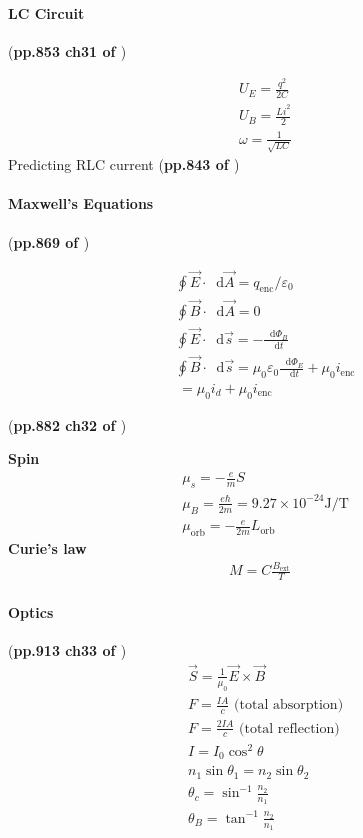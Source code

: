 \documentclass{article}
\newcommand*\diff{\mathop{}\!\mathrm{d}}
\numberwithin{equation}{subsection} %
\theoremstyle{definition}
\begin{document}
\paragraph{LC Circuit} (\textbf{pp.853 ch31 of \cite{book}})

\begin{align}
    & U_E = \frac{q^2}{2C} \\
    & U_B = \frac{L i^2}{2} \\
    & \omega = \frac{1}{\sqrt{LC}}
\end{align}
Predicting RLC current (\textbf{pp.843 of \cite{book}})

\paragraph{Maxwell's Equations} (\textbf{pp.869 of \cite{book}})

\begin{align}
    & \oint \vec{E} \cdot \diff \vec{A} = q_\text{enc}/\varepsilon_0
    \\
    & \oint \vec{B} \cdot\diff\vec{A} = 0 \\
    & \oint \vec{E}\cdot\diff\vec{s} = -\frac{\diff\Phi_B}{\diff t} \\
    & \oint \vec{B}\cdot\diff\vec{s} = 
    \mu_0\varepsilon_0 \frac{\diff\Phi_E}{\diff t} +\mu_0 i_\text{enc}
    \nonumber\\
    & \,= \mu_0 i_d + \mu_0 i_\text{enc}
\end{align}

(\textbf{pp.882 ch32 of \cite{book}})

\textbf{Spin}
\begin{align}
    & \mu_s = -\frac{e}{m} S \\
    & \mu_B = \frac{e\hbar}{2m} = 9.27\times 10^{-24} \text{J/T} \\
    & \mu_\text{orb} = -\frac{e}{2m} L_\text{orb}
\end{align}
\textbf{Curie's law} 
\begin{align}
    M = C\frac{B_\text{ext}}{T}
\end{align}

\paragraph{Optics} (\textbf{pp.913 ch33 of \cite{book}})
\begin{align}
    & \vec{S} = \frac{1}{\mu_0} \vec{E}\times\vec{B} \\
    & F = \frac{IA}{c} \text{ (total absorption)} \\
    & F = \frac{2IA}{c} \text{ (total reflection)} \\
    & I = I_0 \cos^2{\theta} \\
    & n_1 \sin{\theta_1} = n_2 \sin{\theta_2} \\
    & \theta_c = \sin^{-1}\frac{n_2}{n_1} \\
    & \theta_B = \tan^{-1}\frac{n_2}{n_1}
\end{align}
\end{document}
